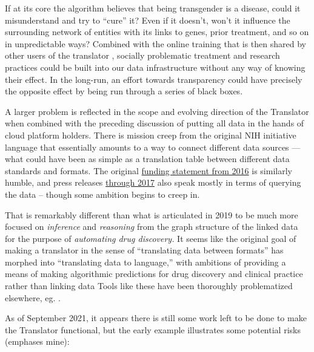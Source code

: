 \documentclass[10pt]{tufte-book}
\begin{document}
If at its core the algorithm believes that being transgender is a
disease, could it misunderstand and try to ``cure'' it? Even if it
doesn't, won't it influence the surrounding network of entities with its
links to genes, prior treatment, and so on in unpredictable ways?
Combined with the online training that is then shared by other users of
the translator \citep{consortiumUniversalBiomedicalData2019} ,
socially problematic treatment and research practices could be built
into our data infrastructure without any way of knowing their effect. In
the long-run, an effort towards transparency could have precisely the
opposite effect by being run through a series of black boxes.

A larger problem is reflected in the scope and evolving direction of the
Translator when combined with the preceding discussion of putting all
data in the hands of cloud platform holders. There is mission creep from
the original NIH initiative language that essentially amounts to a way
to connect different data sources --- what could have been as simple as
a translation table between different data standards and formats. The
original
\href{https://web.archive.org/web/20210709100523/https://ncats.nih.gov/news/releases/2016/feasibility-assessment-translator}{funding
statement from 2016} is similarly humble, and press releases
\href{https://web.archive.org/web/20210709171335/https://ncats.nih.gov/pubs/features/translator}{through
2017} also speak mostly in terms of querying the data -- though some
ambition begins to creep in.

That is remarkably different than what is articulated in 2019 \citep{consortiumUniversalBiomedicalData2019}  to be much more focused on
\emph{inference} and \emph{reasoning} from the graph structure of the
linked data for the purpose of \emph{automating drug discovery.} It
seems like the original goal of making a translator in the sense of
``translating data between formats'' has morphed into ``translating data
to language,'' with ambitions of providing a means of making algorithmic
predictions for drug discovery and clinical practice rather than linking
data \citep{hailuNIHfundedProjectAims2019}  Tools like these have
been thoroughly problematized elsewhere, eg. \citep{groteEthicsAlgorithmicDecisionmaking2020, obermeyerDissectingRacialBias2019, panchArtificialIntelligenceAlgorithmic2019, panchInconvenientTruthAI2019} .

As of September 2021, it appears there is still some work left to be
done to make the Translator functional, but the early example
illustrates some potential risks (emphases mine):
\end{document}
